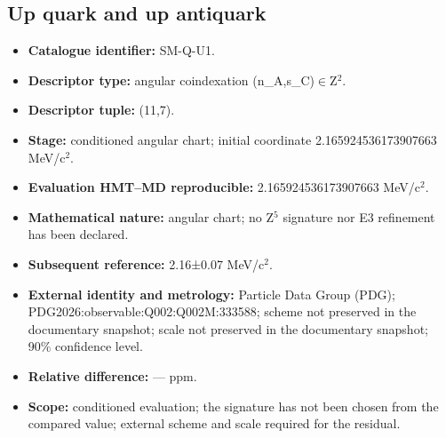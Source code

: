 \subsection{Up quark and up antiquark}
\begin{itemize}
\item \textbf{Catalogue identifier:} SM-Q-U1.
\item \textbf{Descriptor type:} angular coindexation (n\_A,s\_C)\(\in\)Z\({}^{2}\).
\item \textbf{Descriptor tuple:} (11,7).
\item \textbf{Stage:} conditioned angular chart; initial coordinate 2.165924\allowbreak{}536173\allowbreak{}907663 MeV/c\({}^{2}\).
\item \textbf{Evaluation HMT--MD reproducible:} 2.165924\allowbreak{}536173\allowbreak{}907663 MeV/c\({}^{2}\).
\item \textbf{Mathematical nature:} angular chart; no Z\({}^{5}\) signature nor E3 refinement has been declared.
\item \textbf{Subsequent reference:} 2.16±\allowbreak{}0.07 MeV/c\({}^{2}\).
\item \textbf{External identity and metrology:} Particle Data Group (PDG); PDG2026:\allowbreak{}observable:\allowbreak{}Q002:\allowbreak{}Q002M:\allowbreak{}333588; scheme not preserved in the documentary snapshot; scale not preserved in the documentary snapshot; 90\% confidence level.
\item \textbf{Relative difference:} --- ppm.
\item \textbf{Scope:} conditioned evaluation; the signature has not been chosen from the compared value; external scheme and scale required for the residual.
\end{itemize}
